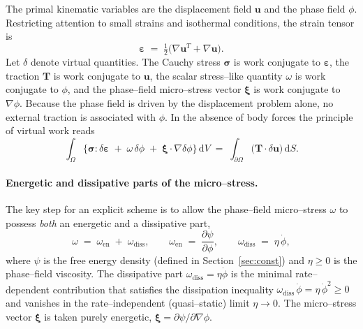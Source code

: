\documentclass[12pt,a4paper]{article}
\newcommand{\bsig}{\boldsymbol{\sigma}}
\newcommand{\beps}{\boldsymbol{\varepsilon}}
\newcommand{\bxi}{\boldsymbol{\xi}}
\newcommand{\bu}{\mathbf{u}}
\newcommand{\bT}{\mathbf{T}}
\newcommand{\dd}{\,\mathrm{d}}
\begin{document}
	The primal kinematic variables are the displacement field $\bu$ and the phase
	field $\phi$. Restricting attention to small strains and isothermal conditions,
	the strain tensor is
	\begin{equation}\label{eq:strain}
		\beps \;=\; \tfrac{1}{2}\bigl(\nabla\bu^{T}+\nabla\bu\bigr).
	\end{equation}
	Let $\delta$ denote virtual quantities. The Cauchy stress $\bsig$ is work
	conjugate to $\beps$, the traction $\bT$ is work conjugate to $\bu$, the scalar
	stress--like quantity $\omega$ is work conjugate to $\phi$, and the phase--field
	micro--stress vector $\bxi$ is work conjugate to $\nabla\phi$. Because the phase
	field is driven by the displacement problem alone, no external traction is
	associated with $\phi$. In the absence of body forces the principle of virtual
	work reads
	\begin{equation}\label{eq:vw}
		\int_{\Omega}\bigl\{\bsig:\delta\beps \;+\; \omega\,\delta\phi \;+\; \bxi\cdot\nabla\delta\phi\bigr\}\dd V
		\;=\; \int_{\partial\Omega}\bigl(\bT\cdot\delta\bu\bigr)\dd S.
	\end{equation}

	\paragraph{Energetic and dissipative parts of the micro--stress.}
	The key step for an explicit scheme is to allow the phase--field micro--stress
	$\omega$ to possess \emph{both} an energetic and a dissipative part,
	\begin{equation}\label{eq:w_split}
		\omega \;=\; \omega_{\mathrm{en}} \;+\; \omega_{\mathrm{diss}},
		\qquad
		\omega_{\mathrm{en}} \;=\; \frac{\partial\psi}{\partial\phi},
		\qquad
		\omega_{\mathrm{diss}} \;=\; \eta\,\dot{\phi},
	\end{equation}
	where $\psi$ is the free energy density (defined in
	Section~\ref{sec:const}) and $\eta\ge 0$ is the phase--field viscosity. The
	dissipative part $\omega_{\mathrm{diss}}=\eta\dot{\phi}$ is the minimal
	rate--dependent contribution that satisfies the dissipation inequality
	$\omega_{\mathrm{diss}}\,\dot{\phi}=\eta\,\dot{\phi}^2\ge 0$ and vanishes in the
	rate--independent (quasi--static) limit $\eta\to 0$. The micro--stress
	vector $\bxi$ is taken purely energetic,
	$\bxi=\partial\psi/\partial\nabla\phi$.
\end{document}
